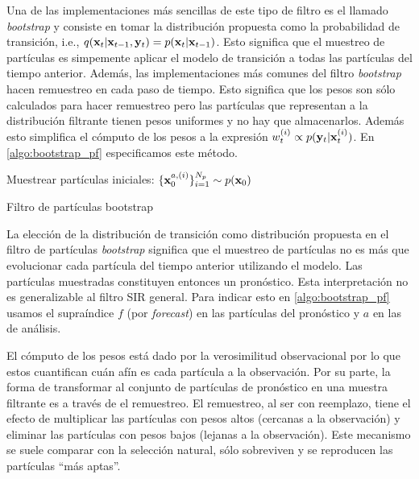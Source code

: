 Una de las implementaciones más sencillas de este tipo de filtro es el llamado \textit{bootstrap} y consiste en tomar la distribución propuesta como la probabilidad de transición, i.e., $q(\mathbf{x}_t | \mathbf{x}_{t-1}, \mathbf{y}_t) = p(\mathbf{x}_t | \mathbf{x}_{t-1})$. Esto significa que el muestreo de partículas es simpemente aplicar el modelo de transición a todas las partículas del tiempo anterior. Además, las implementaciones más comunes del filtro \textit{bootstrap} hacen remuestreo en cada paso de tiempo. Esto significa que los pesos son sólo calculados para hacer remuestreo pero las partículas que representan a la distribución filtrante tienen pesos uniformes y no hay que almacenarlos. Además esto simplifica el cómputo de los pesos a la expresión $w_{t}^{(i)} \propto p(\mathbf{y}_t | \mathbf{x}_t^{(i)})$. En \ref{algo:bootstrap_pf} especificamos este método.

\begin{algorithm}[H]\label{algo:bootstrap_pf}
    Muestrear partículas iniciales: $\{\mathbf{x}_0^{a, (i)}\}_{i=1}^{N_p} \sim p(\mathbf{x}_0)$
    
\caption{Filtro de partículas bootstrap}
\end{algorithm}

La elección de la distribución de transición como distribución propuesta en el filtro de partículas \textit{bootstrap} significa que el muestreo de partículas no es más que evolucionar cada partícula del tiempo anterior utilizando el modelo. Las partículas muestradas constituyen entonces un pronóstico. Esta interpretación no es generalizable al filtro SIR general. Para indicar esto en \ref{algo:bootstrap_pf} usamos el supraíndice $f$ (por \textit{forecast}) en las partículas del pronóstico y $a$ en las de análisis. 

El cómputo de los pesos está dado por la verosimilitud observacional por lo que estos cuantifican cuán afín es cada partícula a la observación. Por su parte, la forma de transformar al conjunto de partículas de pronóstico en una muestra filtrante es a través de el remuestreo. El remuestreo, al ser con reemplazo, tiene el efecto de multiplicar las partículas con pesos altos (cercanas a la observación) y eliminar las partículas con pesos bajos (lejanas a la observación). Este mecanismo se suele comparar con la selección natural, sólo sobreviven y se reproducen las partículas ``más aptas''.

